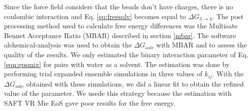 Since the force field considers that the beads don't have charges, there is no coulombic interaction and Eq. \eqref{eq:freesolv} becomes equal to $\Delta G_{3 \rightarrow 4} $. The post processing method used to calculate free energy differences was the Multisate Bennet Acceptance Ratio (MBAR) described in section \ref{mbar}. The software alchemical-analysis \cite{klimovich} was used to obtain the $\Delta G_{solv}$ with MBAR and to assess the quality of the results. We only estimated the binary interaction  parameter of Eq. \eqref{eqn:epsmix} for pairs with water as a solvent. The estimation was done by performing trial  expanded ensemble simulations in three values of $k_{ij}$. With the $\Delta G_{solv}$ obtained with these simulations, we did a linear fit to obtain the refined value of the parameter. We usede this strategy because the estimation with SAFT VR Mie EoS gave poor results for the free energy.

